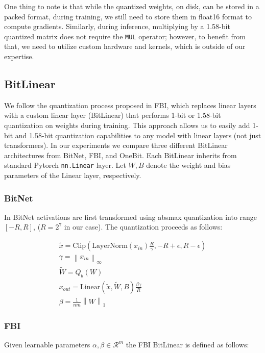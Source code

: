 \documentclass{article}
\begin{document}
One thing to note is that while the quantized weights, on disk, can be stored in a packed format, during training, we still need to store them in float16 format to compute gradients. Similarly, during inference, multiplying by a 1.58-bit quantized matrix does not require the \verb|MUL| operator; however, to benefit from that, we need to utilize custom hardware and kernels, which is outside of our expertise.

\subsection{BitLinear}

We follow the quantization process proposed in FBI, which replaces linear layers with a custom linear layer (BitLinear) that performs 1-bit or 1.58-bit quantization on weights during training. This approach allows us to easily add 1-bit and 1.58-bit quantization capabilities to any model with linear layers (not just transformers). In our experiments we compare three different BitLinear architectures from BitNet, FBI, and OneBit. Each BitLinear inherits from standard Pytorch \texttt{nn.Linear} layer. Let \(W, B\) denote the weight and bias parameters of the Linear layer, respectively.

\subsubsection{BitNet}

In BitNet activations are first transformed using absmax quantization into range \([-R, R]\), (\(R = 2^7\) in our case). The quantization proceeds as follows:

\begin{gather*}
    \tilde{x} = \mathrm{Clip}(\mathrm{LayerNorm}(x_{in}) \frac{R}{\gamma}, -R + \epsilon, R - \epsilon) \\
    \gamma = \left\lVert x_{in} \right\rVert_{\infty} \\
    \widetilde{W} = Q_b(W) \\
    x_{out} = \mathrm{Linear}(\tilde{x}, \widetilde{W}, B) \frac{\beta\gamma}{R} \\
    \beta = \frac{1}{nm}\left\lVert W \right\rVert_{1} 
\end{gather*}

\subsubsection{FBI}

Given learnable parameters \(\alpha, \beta \in \mathcal{R}^m\) the FBI BitLinear is defined as follows:
\end{document}

